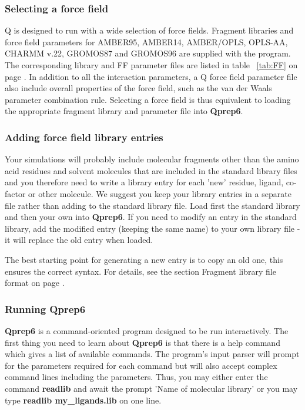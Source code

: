 \documentclass[a4paper,11pt]{article}
\let\origref\ref
\def\ref#1{\unskip~\origref{#1}}
\begin{document}
\subsubsection{Selecting a force field}
Q is designed  to run with a wide selection  of force fields. Fragment
libraries and force field parameters for AMBER95, AMBER14, AMBER/OPLS, 
OPLS-AA,
CHARMM  v.22,  GROMOS87   and  GROMOS96  are  supplied   with  the
program. The corresponding  library and FF parameter  files are listed
in table \ref{tab:FF} on page \pageref{tab:FF}. In addition to all the
interaction parameters,  a Q force  field parameter file  also include
overall  properties of  the force  field, such  as the  van der  Waals
parameter combination rule. Selecting a force field is thus equivalent
to loading  the appropriate fragment  library and parameter  file into
\textbf{Qprep6}.

\subsubsection{Adding force field library entries}
Your simulations will probably include molecular fragments other
than the amino acid residues and solvent molecules that are
included in the standard library files and you therefore need to
write a library entry for each 'new' residue, ligand, co-factor or
other molecule. We suggest you keep your library entries in a
separate file rather than adding to the standard library file.
Load first the standard library and then your own into \textbf{Qprep6}. If
you need to modify an entry in the standard library, add the
modified entry (keeping the same name) to your own library file -
it will replace the old entry when loaded.

The best starting point for generating a new entry is to copy an
old one, this ensures the correct syntax. For details, see the
section Fragment library file format on page
\pageref{subsubsec:fragment_lib_f_f}.

\subsubsection{Running \textbf{Qprep6}}
\textbf{Qprep6} is a command-oriented program designed to be run
interactively. The first thing you need to learn about \textbf{Qprep6} is
that there is a help command which gives a list of available
commands. The program's input parser will prompt for the
parameters required for each command but will also accept complex
command lines including the parameters. Thus, you may either enter
the command \textbf{readlib} and await the prompt 'Name of
molecular library' or you may type \textbf{readlib
my{\_}ligands.lib} on one line.
\end{document}
